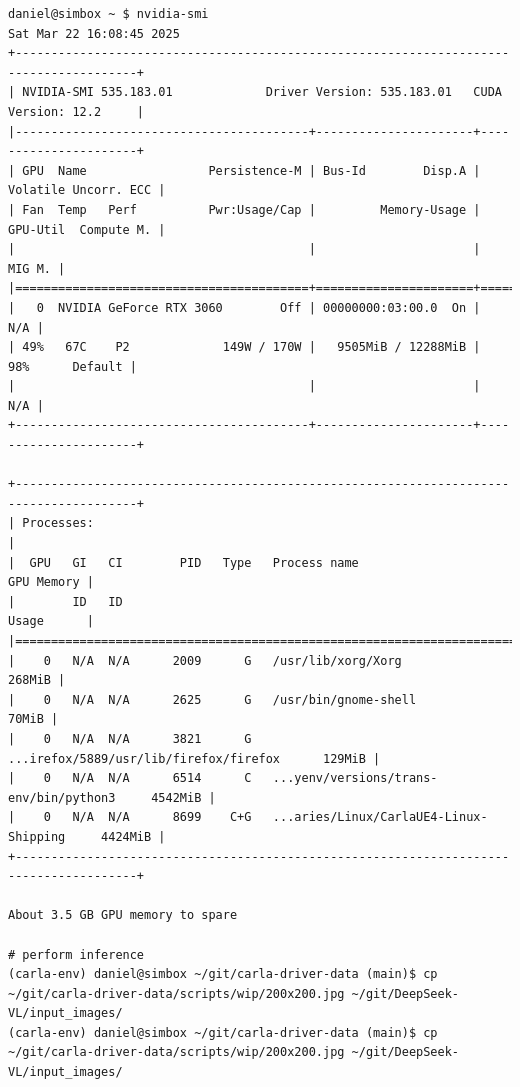 \begin{verbatim}
daniel@simbox ~ $ nvidia-smi
Sat Mar 22 16:08:45 2025       
+---------------------------------------------------------------------------------------+
| NVIDIA-SMI 535.183.01             Driver Version: 535.183.01   CUDA Version: 12.2     |
|-----------------------------------------+----------------------+----------------------+
| GPU  Name                 Persistence-M | Bus-Id        Disp.A | Volatile Uncorr. ECC |
| Fan  Temp   Perf          Pwr:Usage/Cap |         Memory-Usage | GPU-Util  Compute M. |
|                                         |                      |               MIG M. |
|=========================================+======================+======================|
|   0  NVIDIA GeForce RTX 3060        Off | 00000000:03:00.0  On |                  N/A |
| 49%   67C    P2             149W / 170W |   9505MiB / 12288MiB |     98%      Default |
|                                         |                      |                  N/A |
+-----------------------------------------+----------------------+----------------------+
                                                                                         
+---------------------------------------------------------------------------------------+
| Processes:                                                                            |
|  GPU   GI   CI        PID   Type   Process name                            GPU Memory |
|        ID   ID                                                             Usage      |
|=======================================================================================|
|    0   N/A  N/A      2009      G   /usr/lib/xorg/Xorg                          268MiB |
|    0   N/A  N/A      2625      G   /usr/bin/gnome-shell                         70MiB |
|    0   N/A  N/A      3821      G   ...irefox/5889/usr/lib/firefox/firefox      129MiB |
|    0   N/A  N/A      6514      C   ...yenv/versions/trans-env/bin/python3     4542MiB |
|    0   N/A  N/A      8699    C+G   ...aries/Linux/CarlaUE4-Linux-Shipping     4424MiB |
+---------------------------------------------------------------------------------------+

About 3.5 GB GPU memory to spare

# perform inference
(carla-env) daniel@simbox ~/git/carla-driver-data (main)$ cp ~/git/carla-driver-data/scripts/wip/200x200.jpg ~/git/DeepSeek-VL/input_images/
(carla-env) daniel@simbox ~/git/carla-driver-data (main)$ cp ~/git/carla-driver-data/scripts/wip/200x200.jpg ~/git/DeepSeek-VL/input_images/


\end{verbatim}
